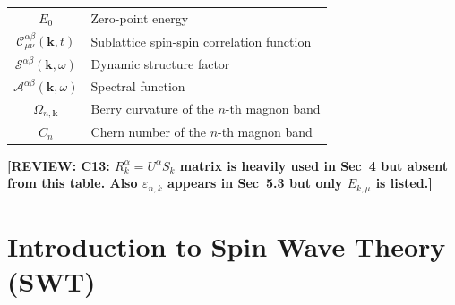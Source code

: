 \documentclass[aps, prx, nofootinbib, superscriptaddress]{revtex4-2}
\newcommand{\REVIEW}[1]{{\color{reviewcolor}\bfseries [REVIEW: #1]}}
\begin{document}
\begin{table}[t]
\begin{tabular}{c|l}
    $E_0$ & Zero-point energy \\
    $\mathcal{C}^{\alpha\beta}_{\mu\nu}(\mathbf{k}, t)$ & Sublattice spin-spin correlation function \\
    $\mathcal{S}^{\alpha\beta}(\mathbf{k}, \omega)$ & Dynamic structure factor \\
    $\mathcal{A}^{\alpha\beta}(\mathbf{k}, \omega)$ & Spectral function \\
    $\Omega_{n,\mathbf{k}}$ & Berry curvature of the $n$-th magnon band \\
    $C_n$ & Chern number of the $n$-th magnon band \\
    \hline
    \end{tabular}
\end{table}

\REVIEW{C13: $R^\alpha_k = U^\alpha S_k$ matrix is heavily used in Sec~4 but absent from this table. Also $\varepsilon_{n,k}$ appears in Sec~5.3 but only $E_{k,\mu}$ is listed.}


\newpage
\section{Introduction to Spin Wave Theory (SWT)}
\end{document}

